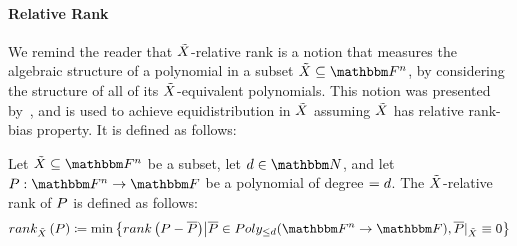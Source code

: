 \paragraph{Relative Rank}
We remind the reader that ${\tilde{X}}$-relative rank is a notion that measures the algebraic structure of a polynomial in a subset $\variety \subseteq \field$, by considering the structure of all of its ${\tilde{X}}$-equivalent polynomials.
This notion was presented by~\cite{gowers2022equidistributionhighrankpolynomialsvariables, lampert2021relative}, and is used to achieve equidistribution in ${\tilde{X}}$ assuming ${\tilde{X}}$ has relative rank-bias property.
It is defined as follows:
\begin{definition}
    Let $\variety \subseteq \field$ be a subset,
    let $\degree \in \naturalnumbersset$, and let $\funcdef{\genpoly}{\field}{\basefield}$ be a polynomial of degree $= d$.
    The ${\tilde{X}}$-relative rank of $\genpoly$ is defined as follows:
    \[
        \relrank{\variety}{\genpoly} \definedas \min \set{\rank{\genpoly - \relativeremainder{\genpoly}} \suchthat
        \relativeremainder{\genpoly} \in \allpolyset{\leq \degree}{\field}{\basefield}, \restrictfunc{\relativeremainder{\genpoly}}{\variety} \equiv 0}
    \]
\end{definition}

